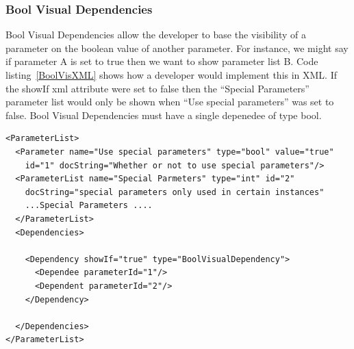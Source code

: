 \subsubsection{Bool Visual Dependencies}
Bool Visual Dependencies allow the developer to base the visibility of a parameter on the boolean value of another parameter. For instance, we might say
if parameter A is set to true then we want to show parameter list B. Code listing~\ref{BoolVisXML} shows how a developer would implement this in XML. If the
showIf xml attribute were set to false then the ``Special Parameters'' parameter list would only be shown when ``Use special parameters'' was set to false.
Bool Visual Dependencies must have a single depenedee of type bool.
\begin{lstlisting}[caption={Example usage of a Bool Visual Dependency}, label=BoolVisXML]
<ParameterList>
  <Parameter name="Use special parameters" type="bool" value="true"
    id="1" docString="Whether or not to use special parameters"/>
  <ParameterList name="Special Parmeters" type="int" id="2"
    docString="special parameters only used in certain instances" 
    ...Special Parameters ....
  </ParameterList>
  <Dependencies>

    <Dependency showIf="true" type="BoolVisualDependency">
      <Dependee parameterId="1"/>
      <Dependent parameterId="2"/>
    </Dependency>

  </Dependencies>
</ParameterList>
\end{lstlisting}

